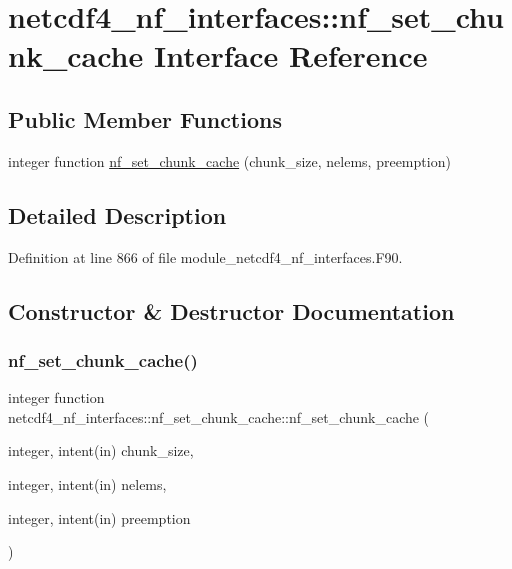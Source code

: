 \hypertarget{interfacenetcdf4__nf__interfaces_1_1nf__set__chunk__cache}{}\section{netcdf4\+\_\+nf\+\_\+interfaces\+:\+:nf\+\_\+set\+\_\+chunk\+\_\+cache Interface Reference}
\label{interfacenetcdf4__nf__interfaces_1_1nf__set__chunk__cache}
\subsection*{Public Member Functions}
\begin{DoxyCompactItemize}
\item 
integer function \hyperlink{interfacenetcdf4__nf__interfaces_1_1nf__set__chunk__cache_aaecb7af1133cbf9d404cc1927b3f871d}{nf\+\_\+set\+\_\+chunk\+\_\+cache} (chunk\+\_\+size, nelems, preemption)
\end{DoxyCompactItemize}


\subsection{Detailed Description}


Definition at line 866 of file module\+\_\+netcdf4\+\_\+nf\+\_\+interfaces.\+F90.



\subsection{Constructor \& Destructor Documentation}
\mbox{\label{interfacenetcdf4__nf__interfaces_1_1nf__set__chunk__cache_aaecb7af1133cbf9d404cc1927b3f871d}} 
\subsubsection{\texorpdfstring{nf\+\_\+set\+\_\+chunk\+\_\+cache()}{nf\_set\_chunk\_cache()}}
{\footnotesize\ttfamily integer function netcdf4\+\_\+nf\+\_\+interfaces\+::nf\+\_\+set\+\_\+chunk\+\_\+cache\+::nf\+\_\+set\+\_\+chunk\+\_\+cache (\begin{DoxyParamCaption}\item[{integer, intent(in)}]{chunk\+\_\+size,  }\item[{integer, intent(in)}]{nelems,  }\item[{integer, intent(in)}]{preemption }\end{DoxyParamCaption})}



